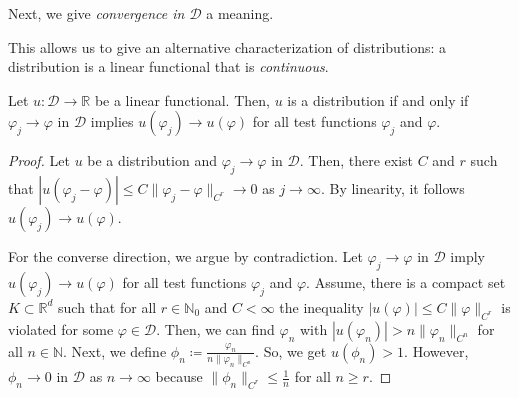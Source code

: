 Next, we give \emph{convergence in \(\mathcal{D}\)} a meaning.


This allows us to give an alternative characterization of distributions: a distribution is a linear functional that is \emph{continuous}.

\begin{lemma}
    Let \(u: \mathcal{D} \to \mathbb{R}\) be a linear functional. Then, \(u\) is a {distribution} if and only if \( \varphi_j \to \varphi \) in \(\mathcal{D}\) implies \(u(\varphi_j) \to u(\varphi)\) for all test functions \(\varphi_j\) and \( \varphi \).
\end{lemma}

\begin{proof}
    Let \(u\) be a distribution and \(\varphi_j \to \varphi \) in \(\mathcal{D}\). Then, there exist \(C\) and \(r\) such that \(|u(\varphi_j -\varphi)| \leq C \lVert \varphi_j - \varphi \rVert_{C^r} \to 0\) as \(j \to \infty \). By linearity, it follows \(u(\varphi_j) \to u(\varphi)\).

    For the converse direction, we argue by contradiction. Let \( \varphi_j \to \varphi \) in \(\mathcal{D}\) imply \(u(\varphi_j) \to u(\varphi)\) for all test functions \(\varphi_j\) and \(\varphi \). Assume, there is a compact set \(K \subset \mathbb{R}^d\) such that for all \(r \in \mathbb{N}_0\) and \(C < \infty \) the inequality \(|u(\varphi)| \leq C \lVert\varphi\rVert_{C^r}\) is violated for some \(\varphi \in \mathcal{D}\). Then, we can find \(\varphi_n\) with \(|u(\varphi_n)| > n \lVert \varphi_n \rVert_{C^n}\) for all \(n \in \mathbb{N}\). Next, we define \(\phi_n \coloneqq \frac{\varphi_n}{n \lVert \varphi_n \rVert_{C^n}}\). So, we get \(u(\phi_n) > 1\). However, \(\phi_n \to 0\) in \(\mathcal{D}\) as \(n \to {\infty}\) because \(\lVert \phi_n \rVert_{C^r} \leq \frac{1}{n}\) for all \(n \geq r\).
\end{proof}

